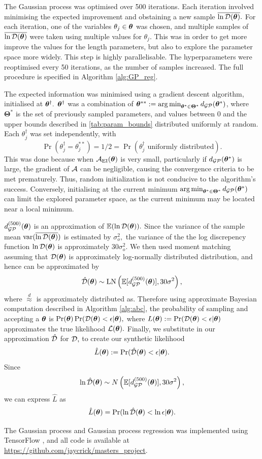 The Gaussian process was optimised over 500 iterations. Each iteration involved
minimising the expected improvement and obstaining a new sample $\overline{\ln\mathcal{D}(\bm{\theta})}.$
For each iteration, one of the variables $\theta_j \in \bm{\theta}$ was chosen, and
multiple samples of $\overline{\ln\mathcal{D}(\bm{\theta})}$ were taken using multiple values for $\theta_j.$
This was in order to get more improve the values for the length parameters, but
also to explore the parameter space more widely. This step is highly
parallelisable.
The hyperparameters were
reoptimised every 50 iterations, as the number of samples increased. The full
procedure is specified in Algorithm \ref{alg:GP_reg}.

The expected information was minimised using a gradient descent algorithm,
initialised at $\bm{\theta}^\dagger.$ $\bm{\theta}^\dagger$ was a
combination of
$\bm{\theta}^{**} := \operatorname*{arg\,min}_{\bm{\theta}^\ast\in\bm{\Theta}^\ast} d_{\mathcal{GP}}(\bm{\theta}^\ast)$,
where $\bm{\Theta}^\ast$ is the set of previously sampled parameters, and
values between 0 and the upper bounds described in \ref{tab:param_bounds}
distributed uniformly at random. Each $\theta_j^\dagger$ was set independently,
with
$$
    \Pr(\theta_j^\dagger = \theta_j^{**})
    = 1/2
    = \Pr(\theta_j^\dagger \text{ uniformly distributed}).
$$
This was done because when $\mathcal{A}_{\mathrm{EI}}(\bm{\theta})$ is very small, particularly if
$d_{\mathcal{GP}}(\bm{\theta}^\ast)$ is
large, the gradient of $\mathcal{A}$ can be negligible, causing the convergence criteria
to be met prematurely. Thus, random initialization is not conducive to the
algorithm's success.
Conversely, initialising at the current minimum
$\operatorname*{arg\,min}_{\bm{\theta}^\ast\in\bm{\Theta}^\ast} d_{\mathcal{GP}}(\bm{\theta}^\ast)$
can limit the explored parameter space, as the current minimum may be located
near a local minimum.

$d_{\mathcal{GP}}^{(500)}(\bm{\theta})$ is an approximation of $\operatorname{\mathbb{E}}(\ln\mathcal{D}(\bm{\theta})).$ Since the
variance of the sample mean $\operatorname{var}(\overline{\ln\mathcal{D}(\bm{\theta})})$ is estimated by $\sigma_o^2,$ the
variance of the the log discrepency function $\ln\mathcal{D}(\bm{\theta})$ is
approximately $30\sigma_o^2.$ We then used moment matching assuming that
$\mathcal{D}(\bm{\theta})$ is approximately log-normally distributed
distribution, and hence can be approximated by
$$
    \hat{\mathcal{D}}(\bm{\theta}) \sim
    \operatorname{LN}\left(\operatorname{\mathbb{E}}[d_{\mathcal{GP}}^{(500)}(\bm{\theta})], 30 \sigma^2\right),
$$
where $\overset{d}{\approx}$ is approximately distributed as.
Therefore using approximate Bayesian computation described in
Algorithm \ref{alg:abc}, the probability of sampling
and accepting a $\bm{\theta}$ is
$\Pr(\bm{\theta})\Pr(\mathcal{D}(\bm{\theta}) < \epsilon | \bm{\theta}),$ where
$L(\bm{\theta}):=\Pr(\mathcal{D}(\bm{\theta}) < \epsilon | \bm{\theta})$ approximates the true
likelihood $\operatorname{\mathcal{L}}(\bm{\theta}).$
Finally, we substitute in our approximation $\hat{\mathcal{D}}$ for $\mathcal{D},$ to create our
synthetic likelihood
$$
    \hat{L}(\bm{\theta}) := \Pr(\hat{\mathcal{D}}(\bm{\theta}) < \epsilon | \bm{\theta}).
$$
Since
$$
    \ln\hat{\mathcal{D}}(\bm{\theta})
    \sim N\left(\operatorname{\mathbb{E}}[d_{\mathcal{GP}}^{(500)}(\bm{\theta})], 30 \sigma^2\right),
$$
we can express $\hat{L}$ as
$$
    \hat{L}(\bm{\theta}) =\Pr(\ln\hat{\mathcal{D}}(\bm{\theta}) < \ln\epsilon | \bm{\theta}).
$$

The Gaussian process and Gaussian process regression was implemented using
TensorFlow \parencite{abadi_tensorflow_2015}, and all code
is available at \url{https://github.com/jaycrick/masters_project}.